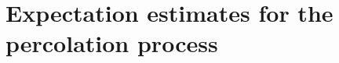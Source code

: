 \documentclass[11pt,reqno]{amsart}
\numberwithin{equation}{section}
\theoremstyle{definition}
\newtheorem{remark}[theorem]{Remark}
\def\CC{{C}}
\def\A{{\mathcal A}}
\def\E{{\mathbb E}}
\def\R{{\mathbb R}}
\def\X{{\mathcal X}}
\begin{document}
%
%



\section{Expectation estimates for the percolation process} \label{se:percolationproofs}
\end{document}
